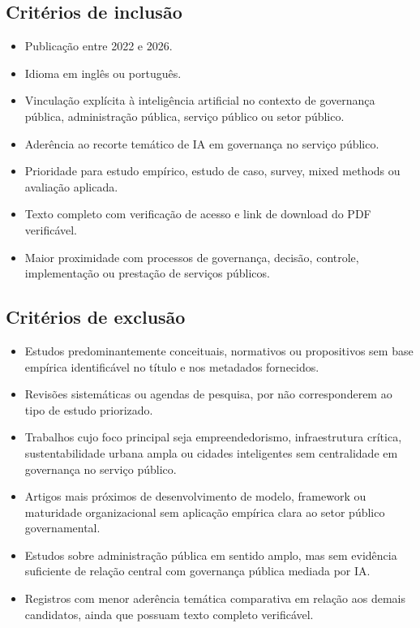 \documentclass[12pt,a4paper]{article}
\begin{document}
\subsection{Critérios de inclusão}
\label{sec:org03e934e}

\begin{itemize}
\item Publicação entre 2022 e 2026.
\item Idioma em inglês ou português.
\item Vinculação explícita à inteligência artificial no contexto de governança pública, administração pública, serviço público ou setor público.
\item Aderência ao recorte temático de IA em governança no serviço público.
\item Prioridade para estudo empírico, estudo de caso, survey, mixed methods ou avaliação aplicada.
\item Texto completo com verificação de acesso e link de download do PDF verificável.
\item Maior proximidade com processos de governança, decisão, controle, implementação ou prestação de serviços públicos.
\end{itemize}

\subsection{Critérios de exclusão}
\label{sec:org3dfb1c3}

\begin{itemize}
\item Estudos predominantemente conceituais, normativos ou propositivos sem base empírica identificável no título e nos metadados fornecidos.
\item Revisões sistemáticas ou agendas de pesquisa, por não corresponderem ao tipo de estudo priorizado.
\item Trabalhos cujo foco principal seja empreendedorismo, infraestrutura crítica, sustentabilidade urbana ampla ou cidades inteligentes sem centralidade em governança no serviço público.
\item Artigos mais próximos de desenvolvimento de modelo, framework ou maturidade organizacional sem aplicação empírica clara ao setor público governamental.
\item Estudos sobre administração pública em sentido amplo, mas sem evidência suficiente de relação central com governança pública mediada por IA.
\item Registros com menor aderência temática comparativa em relação aos demais candidatos, ainda que possuam texto completo verificável.
\end{itemize}
\end{document}
